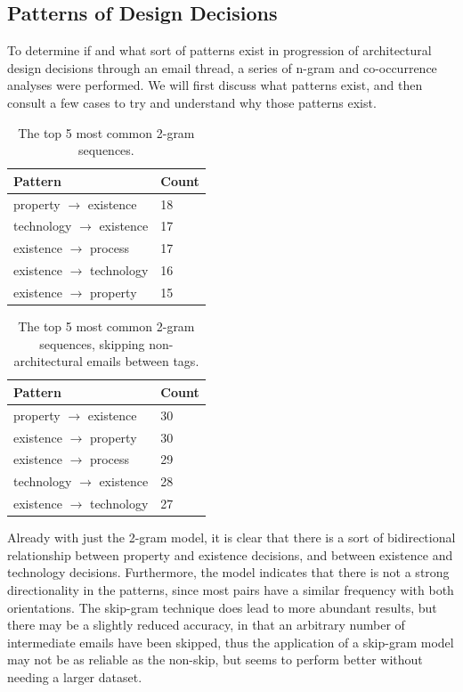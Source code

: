 \documentclass[a4paper, 12pt]{article}
\begin{document}
	\subsection{Patterns of Design Decisions}
		To determine if and what sort of patterns exist in progression of architectural design decisions through an email thread, a series of n-gram and co-occurrence analyses were performed. We will first discuss what patterns exist, and then consult a few cases to try and understand why those patterns exist.
		
		\begin{table}[H]
			\centering
			\caption{The top 5 most common 2-gram sequences.}
			\begin{tabular}{|l|l|}
				\hline
				\textbf{Pattern} & \textbf{Count} \\ \hline
				property $ \rightarrow $ existence & 18 \\ \hline
				technology $ \rightarrow $ existence & 17 \\ \hline
				existence $ \rightarrow $ process & 17 \\ \hline
				existence $ \rightarrow $ technology & 16 \\ \hline
				existence $ \rightarrow $ property & 15 \\ \hline
			\end{tabular}
		\end{table}
		
		\begin{table}[H]
			\centering
			\caption{The top 5 most common 2-gram sequences, skipping non-architectural emails between tags.}
			\begin{tabular}{|l|l|}
				\hline
				\textbf{Pattern} & \textbf{Count} \\ \hline
				property $ \rightarrow $ existence & 30 \\ \hline
				existence $ \rightarrow $ property & 30 \\ \hline
				existence $ \rightarrow $ process & 29 \\ \hline
				technology $ \rightarrow $ existence & 28 \\ \hline
				existence $ \rightarrow $ technology & 27 \\ \hline
			\end{tabular}
		\end{table}
	
		Already with just the 2-gram model, it is clear that there is a sort of bidirectional relationship between property and existence decisions, and between existence and technology decisions. Furthermore, the model indicates that there is not a strong directionality in the patterns, since most pairs have a similar frequency with both orientations. The skip-gram technique does lead to more abundant results, but there may be a slightly reduced accuracy\cite{guthrie}, in that an arbitrary number of intermediate emails have been skipped, thus the application of a skip-gram model may not be as reliable as the non-skip, but seems to perform better without needing a larger dataset.
	
\end{document}
